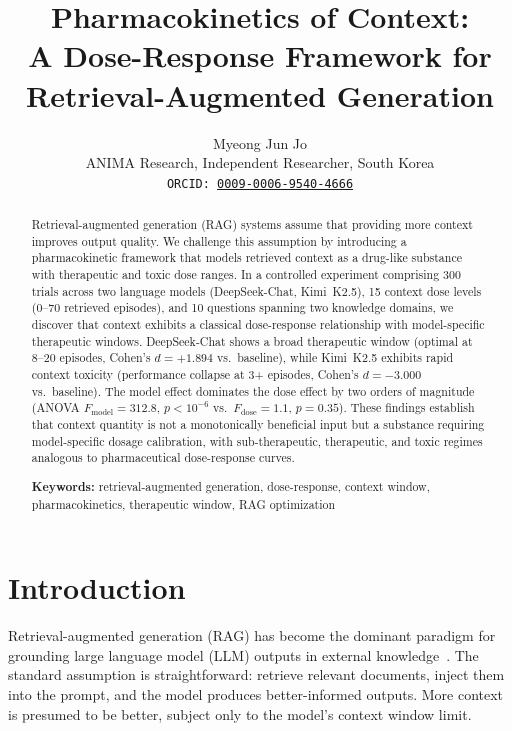 \documentclass[11pt,a4paper]{article}
\title{%
  \textbf{Pharmacokinetics of Context:\\
  A Dose-Response Framework for Retrieval-Augmented Generation}
}
\author{%
  Myeong Jun Jo \\
  ANIMA Research, Independent Researcher, South Korea \\
  \texttt{ORCID: \href{https://orcid.org/0009-0006-9540-4666}{0009-0006-9540-4666}}
}
\date{}
\begin{document}
\maketitle

\begin{abstract}
Retrieval-augmented generation (RAG) systems assume that providing more context improves output quality. We challenge this assumption by introducing a pharmacokinetic framework that models retrieved context as a drug-like substance with therapeutic and toxic dose ranges. In a controlled experiment comprising 300 trials across two language models (DeepSeek-Chat, Kimi~K2.5), 15 context dose levels (0--70 retrieved episodes), and 10 questions spanning two knowledge domains, we discover that context exhibits a classical dose-response relationship with model-specific therapeutic windows. DeepSeek-Chat shows a broad therapeutic window (optimal at 8--20 episodes, Cohen's $d = +1.894$ vs.\ baseline), while Kimi~K2.5 exhibits rapid context toxicity (performance collapse at 3+ episodes, Cohen's $d = -3.000$ vs.\ baseline). The model effect dominates the dose effect by two orders of magnitude (ANOVA $F_{\text{model}} = 312.8$, $p < 10^{-6}$ vs.\ $F_{\text{dose}} = 1.1$, $p = 0.35$). These findings establish that context quantity is not a monotonically beneficial input but a substance requiring model-specific dosage calibration, with sub-therapeutic, therapeutic, and toxic regimes analogous to pharmaceutical dose-response curves.

\vspace{6pt}
\noindent\textbf{Keywords:} retrieval-augmented generation, dose-response, context window, pharmacokinetics, therapeutic window, RAG optimization
\end{abstract}

\section{Introduction}

Retrieval-augmented generation (RAG) has become the dominant paradigm for grounding large language model (LLM) outputs in external knowledge~\citep{lewis2020rag}. The standard assumption is straightforward: retrieve relevant documents, inject them into the prompt, and the model produces better-informed outputs. More context is presumed to be better, subject only to the model's context window limit.
\end{document}
